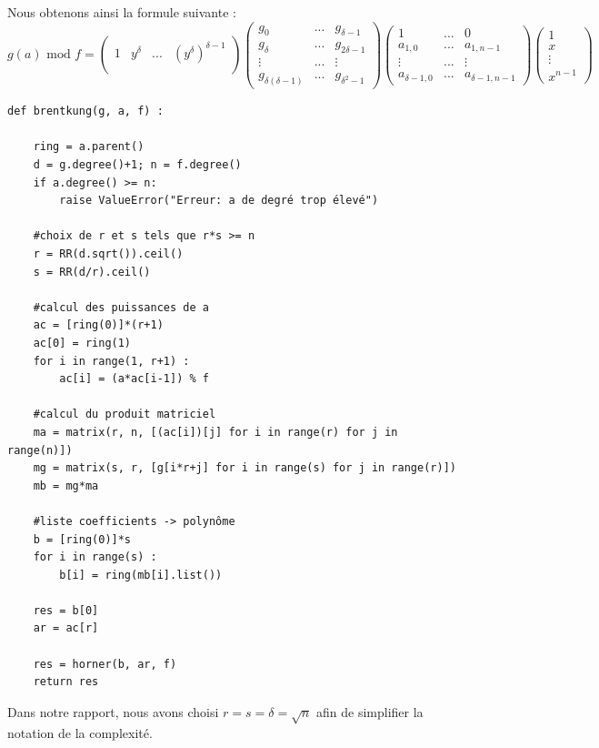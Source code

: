 \documentclass[a4paper]{article}
\begin{document}
Nous obtenons ainsi la formule suivante :
\[
g(a)\text{ mod }f =
\begin{pmatrix}
    1 & y^\delta & ... & (y^\delta)^{\delta-1}  \\  
\end{pmatrix}
\begin{pmatrix}
    g_0 & ... & g_{\delta-1} \\
    g_{\delta} & ... & g_{2\delta-1} \\
    \vdots & ... & \vdots \\
    g_{\delta(\delta-1)} & ... & g_{\delta^2-1}
\end{pmatrix}
\begin{pmatrix}
    1 &  ... & 0 \\
    a_{1,0} & ... & a_{1,n-1} \\
    \vdots &  ... & \vdots \\
    a_{\delta-1,0} & ... & a_{\delta-1,n-1}
\end{pmatrix}
\begin{pmatrix}
    1 \\
    x \\
    \vdots \\
    x^{n-1}
\end{pmatrix}
\]


\begin{lstlisting}[title={brent and kung}]
def brentkung(g, a, f) :

	ring = a.parent()
	d = g.degree()+1; n = f.degree()
	if a.degree() >= n:
		raise ValueError("Erreur: a de degré trop élevé")

    #choix de r et s tels que r*s >= n
	r = RR(d.sqrt()).ceil()
	s = RR(d/r).ceil()

    #calcul des puissances de a
	ac = [ring(0)]*(r+1)
	ac[0] = ring(1)
	for i in range(1, r+1) :
		ac[i] = (a*ac[i-1]) % f

    #calcul du produit matriciel
	ma = matrix(r, n, [(ac[i])[j] for i in range(r) for j in range(n)])
	mg = matrix(s, r, [g[i*r+j] for i in range(s) for j in range(r)])
	mb = mg*ma

    #liste coefficients -> polynôme
	b = [ring(0)]*s
	for i in range(s) :
		b[i] = ring(mb[i].list())

	res = b[0]
	ar = ac[r]

	res = horner(b, ar, f)
	return res
\end{lstlisting}

Dans notre rapport, nous avons choisi $ r = s = \delta = \sqrt{n}$ afin de simplifier la notation de la complexité.
\end{document}
